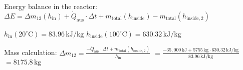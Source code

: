 Energy balance in the reactor:  
\( \Delta E = \Delta m_{12} (h_{\text{in}}) + \dot{Q}_{\text{aus}} \cdot \Delta t + m_{\text{total}} (h_{\text{inside}}) - m_{\text{total}} (h_{\text{inside},2}) \)  

\( h_{\text{in}}(20^\circ \text{C}) = 83.96 \, \text{kJ/kg} \)  
\( h_{\text{inside}}(100^\circ \text{C}) = 630.32 \, \text{kJ/kg} \)  

Mass calculation:  
\( \Delta m_{12} = \frac{-\dot{Q}_{\text{aus}} \cdot \Delta t + m_{\text{total}} (h_{\text{inside},2})}{h_{\text{in}}} \)  
\( = \frac{-35,000 \, \text{kJ} + 5755 \, \text{kg} \cdot 630.32 \, \text{kJ/kg}}{83.96 \, \text{kJ/kg}} \)  
\( = 8175.8 \, \text{kg} \)